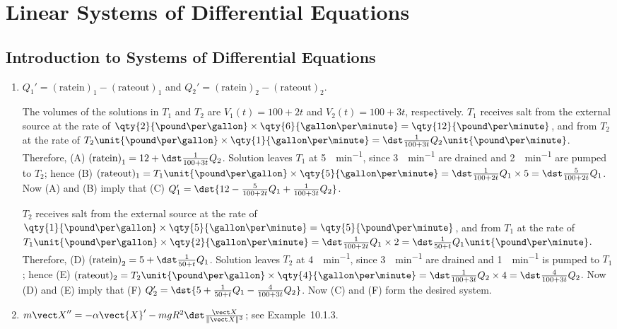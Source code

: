 \documentclass[openany]{book}
\newenvironment{sectionSolutions}{
 \begin{enumerate}[item-label={\thesection.\arabic{enumi}.}]
}{
 \end{enumerate}
}
\begin{document}
\chapter{Linear Systems of Differential Equations}

\section{Introduction to Systems of Differential Equations}

\begin{sectionSolutions}
\item
$Q_1'=(\mathrm{rate in})_1-(\mathrm{rate out})_1$ and $Q_2'=(\mathrm{rate
in})_2-(\mathrm{rate out})_2$.

The volumes of the solutions in $T_1$ and $T_2$ are $V_1(t)=100+2t$
and $V_2(t)=100+3t$, respectively. $T_1$ receives salt from the
external source at the rate of $\qty{2}{\pound\per\gallon}\times\qty{6}{\gallon\per\minute}=\qty{12}{\pound\per\minute}$, and from $T_2$ at the rate of
$T_2\unit{\pound\per\gallon}\times\qty{1}{\gallon\per\minute}=\dst\frac{1}{100+3t}Q_2\unit{\pound\per\minute}$. Therefore, (A) $\mathrm{(rate
in)}_1= 12+\dst\frac{1}{100+3t}Q_2$. Solution leaves $T_1$ at \qty{5}{\gallon\per\minute},
since \qty{3}{\gallon\per\minute} are drained and \qty{2}{\gallon\per\minute} are pumped to $T_2$; hence
(B) $(\mathrm{rate out})_1=T_1\unit{\pound\per\gallon}\times
\qty{5}{\gallon\per\minute}
=\dst\frac{1}{100+2t}Q_1\times5=\dst\frac{5}{100+2t}Q_1$. Now (A) and (B)
imply that (C) $Q_1'=\dst{12-\frac{5}{100+2t}Q_1+\frac{1}{100+3t}Q_2}$.

$T_2$ receives salt from the external source at the rate of
$\qty{1}{\pound\per\gallon}\times\qty{5}{\gallon\per\minute}=\qty{5}{\pound\per\minute}$, and from $T_1$
at the rate of $T_1\unit{\pound\per\gallon}\times\qty{2}{\gallon\per\minute}=\dst\frac{1}{100+2t}Q_1\times2=\dst\frac{1}{50+t}Q_1 \unit{\pound\per\minute}$.
Therefore, (D) $\mathrm{(rate in)}_2= 5+\dst\frac{1}{50+t}Q_1$. Solution
leaves $T_2$ at \qty{4}{\gallon\per\minute}, since
\qty{3}{\gallon\per\minute} are drained and \qty{1}{\gallon\per\minute}
is pumped to $T_1$; hence (E)
$(\mathrm{rate out})_2=T_2\unit{\pound\per\gallon}\times\qty{4}{\gallon\per\minute}
=\dst\frac{1}{100+3t}Q_2\times4=\dst\frac{4}{100+3t}Q_2$. Now (D) and (E)
imply that (F) $Q_2'=\dst{5+\frac{1}{50+t}Q_1-\frac{4}{100+3t}Q_2}$. Now
(C) and (F) form the desired system.




\item
$m{\vect X}''=-\alpha{\vect{X}'}-mgR^2\dst\frac{{\vect X}}{\|{\vect X}\|^3}$;
see Example~10.1.3.


\end{sectionSolutions}
\end{document}
